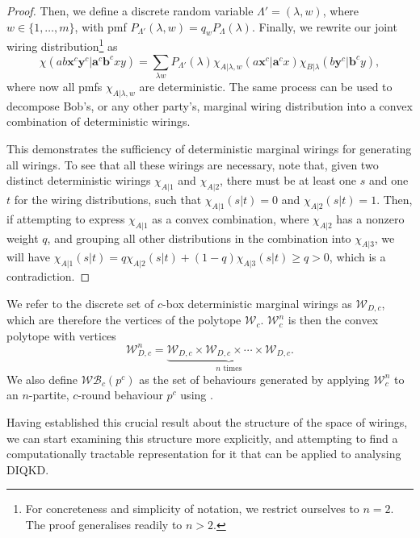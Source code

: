 \documentclass[10pt, a4paper]{article}
\numberwithin{equation}{section} %
\theoremstyle{definition}
\theoremstyle{plain}
\newcommand{\dintv}[2]{\mathopen\{#1,\ldots,#2\mathclose\}}
\newcommand{\?}{\mathrel{?}} %
\newcommand{\cvec}[1]{\boldsymbol{\mathbf{#1}}}    %
\newcommand{\sW}{\mathcal{W}}
\newcommand{\sWB}{\mathcal{WB}}
\begin{document}
\begin{proof}
                Then, we define a discrete random variable \(\Lambda' = (\lambda, w)\), where \(w \in \dintv{1}{m}\), with pmf \(P_{\Lambda'}(\lambda, w) = q_w P_{\Lambda}(\lambda)\). Finally, we rewrite our joint wiring distribution\footnote{For concreteness and simplicity of notation, we restrict ourselves to \(n=2\). The proof generalises readily to \(n>2\).} as
                \begin{equation}
                  \chi(ab\cvec{x}^c\cvec{y}^c|\cvec{a}^c\cvec{b}^cxy) = \sum_{\lambda w} P_{\Lambda'}(\lambda) \chi_{A|\lambda,w}(a\cvec{x}^c|\cvec{a}^cx) \chi_{B|\lambda}(b\cvec{y}^c|\cvec{b}^cy),
                \end{equation}
                where now all pmfs \(\chi_{A|\lambda,w}\) are deterministic. The same process can be used to decompose Bob's, or any other party's, marginal wiring distribution into a convex combination of deterministic wirings.

                This demonstrates the sufficiency of deterministic marginal wirings for generating all wirings. To see that all these wirings are necessary, note that, given two distinct deterministic wirings \(\chi_{A|1}\) and \(\chi_{A|2}\), there must be at least one \(s\) and one \(t\) for the wiring distributions, such that \(\chi_{A|1}(s|t) = 0\) and \(\chi_{A|2}(s|t) = 1\). Then, if attempting to express \(\chi_{A|1}\) as a convex combination, where \(\chi_{A|2}\) has a nonzero weight \(q\), and grouping all other distributions in the combination into \(\chi_{A|3}\), we will have \(\chi_{A|1}(s|t) = q\chi_{A|2}(s|t) + (1-q)\chi_{A|3}(s|t) \geq q > 0\), which is a contradiction.
              \end{proof}

              We refer to the discrete set of \(c\)-box deterministic marginal wirings as \(\sW_{D,c}\), which are therefore the vertices of the polytope \(\sW_c\). \(\sW_c^n\) is then the convex polytope with vertices
              \begin{equation}
                \sW_{D,c}^n = \underbrace{\sW_{D,c} \times \sW_{D,c} \times \cdots \times \sW_{D,c}}_{n\text{ times}}.
              \end{equation}
              We also define \(\sWB_c(p^c)\) as the set of behaviours generated by applying \(\sW_c^n\) to an \(n\)-partite, \(c\)-round behaviour \(p^c\) using .

              Having established this crucial result about the structure of the space of wirings, we can start examining this structure more explicitly, and attempting to find a computationally tractable representation for it that can be applied to analysing DIQKD.
\end{document}
